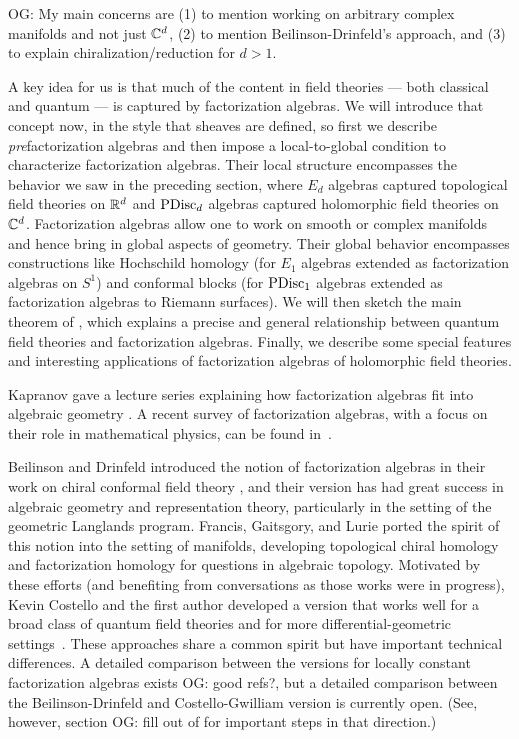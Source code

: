 \documentclass[11pt]{amsart}
\def\owen#1{{\textcolor{violet!50!black}{OG: {#1}}}}
\begin{document}
\owen{My main concerns are (1) to mention working on arbitrary complex manifolds and not just $\mathbb C^d$, (2) to mention Beilinson-Drinfeld's approach, and (3) to explain chiralization/reduction for $d > 1$.}

A key idea for us is that much of the content in field theories --- both classical and quantum --- is captured by factorization algebras.
We will introduce that concept now, in the style that sheaves are defined, so first we describe {\em pre}\/factorization algebras and then impose a local-to-global condition to characterize factorization algebras.
Their local structure encompasses the behavior we saw in the preceding section, where $E_d$ algebras captured topological field theories on $\mathbb R^d$ and ${\rm PDisc}_d$ algebras captured holomorphic field theories on~$\mathbb C^d$.
Factorization algebras allow one to work on smooth or complex manifolds and hence bring in global aspects of geometry.
Their global behavior encompasses constructions like Hochschild homology (for $E_1$ algebras extended as factorization algebras on $S^1$) and conformal blocks (for ${\rm PDisc}_1$ algebras extended as factorization algebras to Riemann surfaces).
We will then sketch the main theorem of \cite{CG2}, 
which explains a precise and general relationship between quantum field theories and factorization algebras.
Finally, we describe some special features and interesting applications of factorization algebras of holomorphic field theories.

Kapranov gave a lecture series explaining how factorization algebras fit into algebraic geometry \cite{KapLect}.
A recent survey of factorization algebras, with a focus on their role in mathematical physics, can be found in~\cite{CosGwEMP}.

\begin{rmk}
Beilinson and Drinfeld introduced the notion of factorization algebras in their work on chiral conformal field theory \cite{BD},
and their version has had great success in algebraic geometry and representation theory,
particularly in the setting of the geometric Langlands program.
Francis, Gaitsgory, and Lurie ported the spirit of this notion into the setting of manifolds,
developing topological chiral homology \cite{LurieHA} and factorization homology \cite{AF}
for questions in algebraic topology.
Motivated by these efforts (and benefiting from conversations as those works were in progress), 
Kevin Costello and the first author developed a version that works well for a broad class of quantum field theories and for more differential-geometric settings~\cite{CG1,CG2}.
These approaches share a common spirit but have important technical differences.
A detailed comparison between the versions for locally constant factorization algebras exists \owen{good refs?},
but a detailed comparison between the Beilinson-Drinfeld and Costello-Gwilliam version is currently open.
(See, however, section \owen{fill out } of \cite{HenKap} for important steps in that direction.)
\end{rmk}
\end{document}
